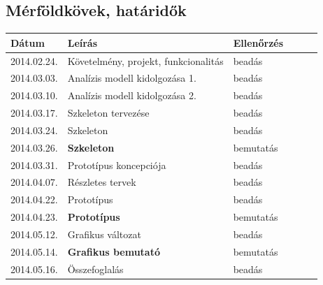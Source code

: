 \pagebreak

\subsection{Mérföldkövek, határidők}
\begin{longtable}{| l | p{7cm} | l | l | l | l |}
\hline
\textbf{Dátum} & \textbf{Leírás} & \textbf{Ellenőrzés} \tabularnewline
\hline\hline
2014.02.24. & Követelmény, projekt, funkcionalitás & beadás \tabularnewline
\hline
2014.03.03. & Analízis modell kidolgozása 1. & beadás \tabularnewline
\hline
2014.03.10. & Analízis modell kidolgozása 2. & beadás \tabularnewline
\hline
2014.03.17. & Szkeleton tervezése & beadás \tabularnewline
\hline
2014.03.24. & Szkeleton & beadás \tabularnewline
\hline
2014.03.26. & \textbf{Szkeleton} & bemutatás \tabularnewline
\hline
2014.03.31. & Prototípus koncepciója & beadás \tabularnewline
\hline
2014.04.07. & Részletes tervek & beadás \tabularnewline
\hline
2014.04.22. & Prototípus & beadás \tabularnewline
\hline
2014.04.23. & \textbf{Prototípus} & bemutatás \tabularnewline
\hline
2014.05.12. & Grafikus változat & beadás \tabularnewline
\hline
2014.05.14. & \textbf{Grafikus bemutató} & bemutatás \tabularnewline
\hline
2014.05.16. & Összefoglalás & beadás \tabularnewline
\hline
\end{longtable}

